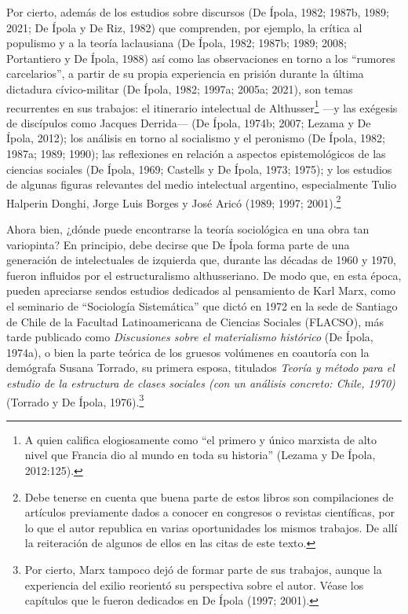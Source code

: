 Por cierto, además de los estudios sobre discursos (De Ípola, 1982; 1987b, 1989; 2021; De Ípola y De Riz, 1982) que comprenden, por ejemplo, la crítica al populismo y a la teoría laclausiana (De Ípola, 1982; 1987b; 1989; 2008; Portantiero y De Ípola, 1988) así como las observaciones en torno a los ``rumores carcelarios'', a partir de su propia experiencia en prisión durante la última dictadura cívico-militar (De Ípola, 1982; 1997a; 2005a; 2021), son temas recurrentes en sus trabajos: el itinerario intelectual de Althusser\footnote{A quien califica elogiosamente como ``el primero y único marxista de alto nivel que Francia dio al mundo en toda su historia'' (Lezama y De Ípola, 2012:125).} ---y las exégesis de discípulos como Jacques Derrida--- (De Ípola, 1974b; 2007; Lezama y De Ípola, 2012); los análisis en torno al socialismo y el peronismo (De Ípola, 1982; 1987a; 1989; 1990); las reflexiones en relación a aspectos epistemológicos de las ciencias sociales (De Ípola, 1969; Castells y De Ípola, 1973; 1975); y los estudios de algunas figuras relevantes del medio intelectual argentino, especialmente Tulio Halperin Donghi, Jorge Luis Borges y José Aricó (1989; 1997; 2001).\footnote{Debe tenerse en cuenta que buena parte de estos libros son compilaciones de artículos previamente dados a conocer en congresos o revistas científicas, por lo que el autor republica en varias oportunidades los mismos trabajos. De allí la reiteración de algunos de ellos en las citas de este texto.}

Ahora bien, ¿dónde puede encontrarse la teoría sociológica en una obra tan variopinta? En principio, debe decirse que De Ípola forma parte de una generación de intelectuales de izquierda que, durante las décadas de 1960 y 1970, fueron influidos por el estructuralismo althusseriano. De modo que, en esta época, pueden apreciarse sendos estudios dedicados al pensamiento de Karl Marx, como el seminario de ``Sociología Sistemática'' que dictó en 1972 en la sede de Santiago de Chile de la Facultad Latinoamericana de Ciencias Sociales (FLACSO), más tarde publicado como \emph{Discusiones sobre el materialismo histórico} (De Ípola, 1974a), o bien la parte teórica de los gruesos volúmenes en coautoría con la demógrafa Susana Torrado, su primera esposa, titulados \emph{Teoría y método para el estudio de la estructura de clases sociales (con un análisis concreto: Chile, 1970)} (Torrado y De Ípola, 1976).\footnote{Por cierto, Marx tampoco dejó de formar parte de sus trabajos, aunque la experiencia del exilio reorientó su perspectiva sobre el autor. Véase los capítulos que le fueron dedicados en De Ípola (1997; 2001).}


